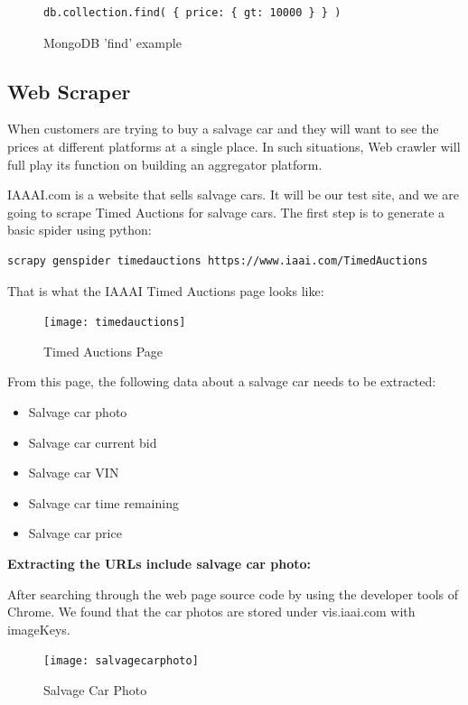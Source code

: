 \documentclass[onecolumn, draftclsnofoot,10pt, compsoc]{IEEEtran}
\begin{document}
\begin{figure}[ht]
\centering
\begin{verbatim}
db.collection.find( { price: { gt: 10000 } } )
\end{verbatim}
\caption{MongoDB 'find' example}
\end{figure}



\subsection{Web Scraper}
When customers are trying to buy a salvage car and they will want to see the prices at different platforms at a single place. In such situations, Web crawler will full play its function on building an aggregator platform.

IAAAI.com is a website that sells salvage cars.\cite{IAAI} It will be our test site, and we are going to scrape Timed Auctions for salvage cars. The first step is to generate a basic spider using python:

\begin{verbatim}
scrapy genspider timedauctions https://www.iaai.com/TimedAuctions
\end{verbatim}

That is what the IAAAI Timed Auctions page looks like:

\begin{figure}[ht]
\centering
\texttt{[image: timedauctions]}
\caption{Timed Auctions Page}
\label{fig:auction}
\end{figure}
\newpage
From this page, the following data about a salvage car needs to be extracted:

\begin{itemize}
\item Salvage car photo
\item Salvage car current bid
\item Salvage car VIN
\item Salvage car time remaining
\item Salvage car price
\end{itemize}

\textbf{Extracting the URLs include salvage car photo:}

After searching through the web page source code by using the developer tools of Chrome. We found that the car photos are stored under vis.iaai.com with imageKeys.

\begin{figure}[ht]
\centering
\texttt{[image: salvagecarphoto]}
\caption{Salvage Car Photo}
\label{fig:salvage}
\end{figure}
\end{document}
